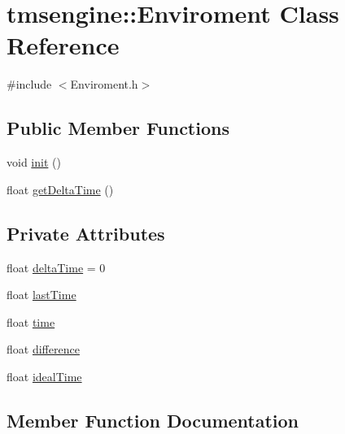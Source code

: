 \hypertarget{classtmsengine_1_1_enviroment}{}\section{tmsengine\+:\+:Enviroment Class Reference}
\label{classtmsengine_1_1_enviroment}


{\ttfamily \#include $<$Enviroment.\+h$>$}

\subsection*{Public Member Functions}
\begin{DoxyCompactItemize}
\item 
void \hyperlink{classtmsengine_1_1_enviroment_ae82cd04e139ac869bdb6a1b41a28c830}{init} ()
\item 
float \hyperlink{classtmsengine_1_1_enviroment_aaa6d260aca99eb32d5ee96771fe34a01}{get\+Delta\+Time} ()
\end{DoxyCompactItemize}
\subsection*{Private Attributes}
\begin{DoxyCompactItemize}
\item 
float \hyperlink{classtmsengine_1_1_enviroment_a6481f99308483a38e2a130f775767dd3}{delta\+Time} = 0
\item 
float \hyperlink{classtmsengine_1_1_enviroment_a54af05c4adbbd3fe48826def702930c6}{last\+Time}
\item 
float \hyperlink{classtmsengine_1_1_enviroment_ae84ce684b9aa9f35f2bfc75bf22ab924}{time}
\item 
float \hyperlink{classtmsengine_1_1_enviroment_a8beebe427c5a407990fbd3045b16a2c6}{difference}
\item 
float \hyperlink{classtmsengine_1_1_enviroment_a69006efe0a003b6190a4117585c90f99}{ideal\+Time}
\end{DoxyCompactItemize}


\subsection{Member Function Documentation}
\mbox{\label{classtmsengine_1_1_enviroment_aaa6d260aca99eb32d5ee96771fe34a01}} 
